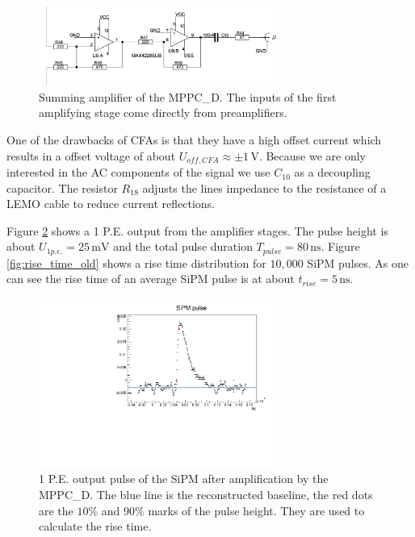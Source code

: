 	\begin{figure}[t]
		\centering
			\includegraphics[width=0.7\textwidth]{Figures/weinstock/sum_amp.png}
		\caption{Summing amplifier of the MPPC\_D. The inputs of the first amplifying stage come directly from preamplifiers.}
		\label{fig:sum_amp}
	\end{figure}	

	
One of the drawbacks of CFAs is that they have a high offset current which results in a offset voltage of about $U_{off,CFA}\approx \pm 1\,\text{V}$. Because we are only interested in the AC components of the signal we use $C_{10}$ as a decoupling capacitor. The resistor $R_{18}$ adjusts the lines impedance to the resistance of a LEMO cable to reduce current reflections.

Figure \ref{fig:sipm_pulse_old} shows a 1 P.E. output from the amplifier stages. The pulse height is about $U_{1p.e.} = 25\,\text{mV}$ and the total pulse duration $T_{pulse} = 80\,\text{ns}$. Figure \ref{fig:rise_time_old} shows a rise time distribution for $10,000$ SiPM pulses. As one can see the rise time of an average SiPM pulse is at about $t_{rise} = 5\,\text{ns}$.

	\begin{figure}[t]
		\centering
			\includegraphics[width=0.7\textwidth]{Figures/weinstock/old_amp_1pe.pdf}
		\caption{1 P.E. output pulse of the SiPM after amplification by the MPPC\_D. The blue line is the reconstructed baseline, the red dots are the $10\%$ and $90 \%$ marks of the pulse height. They are used to calculate the rise time.}
		\label{fig:sipm_pulse_old}
	\end{figure}
	
